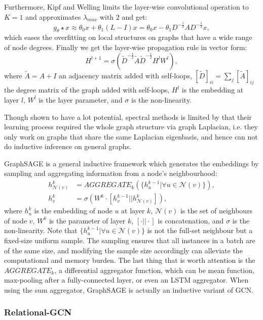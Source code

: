 \documentclass[12pt]{report}
\begin{document}
Furthermore, Kipf and Welling \cite{kipf_semi-supervised_2016} limits the layer-wise convolutional operation to $K=1$ and approximates $\lambda_{max}$ with $2$ and get:
\[g_\theta \star x \approx \theta_0x + \theta_1(L-I)x = \theta_0x-\theta_1 D^{-\frac{1}{2}}AD^{-\frac{1}{2}}x,\]
which eases the overfitting on local structures on graphs that have a wide range of node degrees. Finally we get the layer-wise propagation rule in vector form:
\[H^{l+1} = \sigma(\tilde{D}^{-\frac{1}{2}}\tilde{A}\tilde{D}^{-\frac{1}{2}}H^l W^l),\]
where $\tilde{A}=A+I$ an adjacency matrix added with self-loops, $[\tilde{D}]_{ii}=\sum_j[\tilde{A}]_{ij}$ the degree matrix of the graph added with self-loops, $H^l$ is the embedding at layer $l$, $W^l$ is the layer parameter, and $\sigma$ is the non-linearity.

Though shown to have a lot potential, spectral methods is limited by that their learning process required the whole graph structure via graph Laplacian, i.e. they only work on graphs that share the same Laplacian eigenbasis, and hence can not do inductive inference on general graphs.

GraphSAGE \cite{hamilton_inductive_2017} is a general inductive framework which generates the embeddings by sampling and aggregating information from a node's neighbourhood:
\begin{align*}
h^k_{\mathcal{N}(v)} &= AGGREGATE_k(\{h^{k-1}_u|\forall u\in\mathcal{N}(v)\}),\\
h^k_v &= \sigma(W^k\cdot [h^{k-1}_v||h^k_{\mathcal{N}(v)}]),
\end{align*}
where $h_u^k$ is the embedding of node $u$ at layer $k$, $\mathcal{N}(v)$ is the set of neighbours of node $v$, $W^k$ is the parameter of layer $k$, $[\cdot||\cdot]$ is concatenation, and $\sigma$ is the non-linearity. Note that $\{h^{k-1}_u|\forall u\in\mathcal{N}(v)\}$ is not the full-set neighbour but a fixed-size uniform sample. The sampling ensures that all instances in a batch are of the same size, and modifying the sample size accordingly can alleviate the computational and memory burden. The last thing that is worth attention is the $AGGREGATE_k$, a differential aggregator function, which can be mean function, max-pooling after a fully-connected layer, or even an LSTM aggregator. When using the sum aggregator, GraphSAGE is actually an inductive variant of GCN.

\subsubsection{Relational-GCN}
\end{document}
